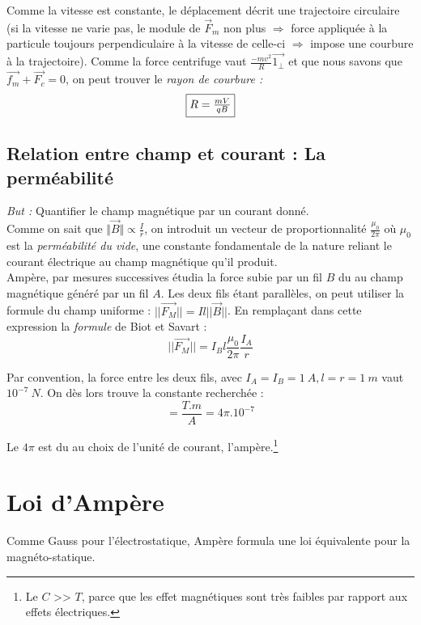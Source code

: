 \documentclass	[11pt, a4paper, openany]{book}
\begin{document}
Comme la vitesse est constante, le déplacement décrit une trajectoire circulaire (si la vitesse ne varie pas, le module de $\vec{F}_m$ non plus $\Rightarrow$ force appliquée à la particule toujours perpendiculaire à la vitesse de celle-ci $\Rightarrow$ impose une courbure à la trajectoire). Comme la force centrifuge vaut $\frac{-mv^2}{R}\vec{1_\perp}$ et que nous savons que $\vec{f_m} + \vec{F_c} = 0$, on peut trouver le \textit{rayon de courbure :}
\begin{equation}
\fbox{$R = \frac{mV}{qB}$} 
\end{equation}


\subsection{Relation entre champ et courant : La perméabilité}
\textit{But :} Quantifier le champ magnétique par un courant donné.\\
Comme on sait que $\Vert \vec{B} \Vert \propto \frac{I}{r}$, on introduit un vecteur de proportionnalité $\frac{\mu_0}{2\pi}$ où $\mu_0$ est la \textit{perméabilité du vide}, une constante fondamentale de la nature reliant le courant électrique au champ magnétique qu'il produit.\\

Ampère, par mesures successives étudia la force subie par un fil $B$ du au champ magnétique généré par un fil $A$. Les deux fils étant parallèles, on peut utiliser la formule du champ uniforme : $||\vec{F_M}|| = I l ||\vec{B}||$. En remplaçant dans cette expression la \textit{formule} de Biot et Savart :
\begin{equation}
||\vec{F_M}|| = I_Bl\frac{\mu_0}{2\pi}\frac{I_A}{r}
\end{equation}




Par convention, la force entre les deux fils, avec $I_A = I_B = 1\ A, l = r = 1\ m$ vaut $10^{-7}\ N$. On dès lors trouve la constante recherchée :
\begin{equation}
[\mu_0] = \frac{T.m}{A} = 4\pi . 10^{-7}
\end{equation}

Le $4\pi$ est du au choix de l'unité de courant, l'ampère.\footnote{Le $C$ >> $T$, parce que les effet magnétiques sont très faibles par rapport aux effets électriques.}

\section{Loi d'Ampère}
Comme Gauss pour l'électrostatique, Ampère formula une loi équivalente pour la magnéto-statique.
\end{document}
